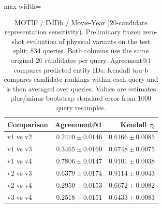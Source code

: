 \begin{table}[htbp]
\centering
\small
\begin{adjustbox}{max width=\linewidth}
\begin{tabular}{lrr}
\toprule
Comparison & Agreement@1 & Kendall $\tau_b$ \\
\midrule
v1 vs v2 & $0.2410 \pm 0.0146$ & $0.6166 \pm 0.0085$ \\
v1 vs v3 & $0.3465 \pm 0.0160$ & $0.6748 \pm 0.0075$ \\
v1 vs v4 & $0.7806 \pm 0.0147$ & $0.9101 \pm 0.0038$ \\
v2 vs v3 & $0.6379 \pm 0.0174$ & $0.9114 \pm 0.0043$ \\
v2 vs v4 & $0.2950 \pm 0.0153$ & $0.6672 \pm 0.0082$ \\
v3 vs v4 & $0.2518 \pm 0.0151$ & $0.6433 \pm 0.0083$ \\
\bottomrule
\end{tabular}
\end{adjustbox}
\caption{MOTIF / IMDb / Movie-Year (20-candidate representation sensitivity). Preliminary frozen zero-shot evaluation of physical variants on the test split; 834 queries. Both columns use the same original 20 candidates per query. Agreement@1 compares predicted entity IDs; Kendall tau-b compares candidate rankings within each query and is then averaged over queries. Values are estimates plus/minus bootstrap standard error from 1000 query resamples.}
\label{tab:motif-imdb-movie-year-invariance}
\end{table}
